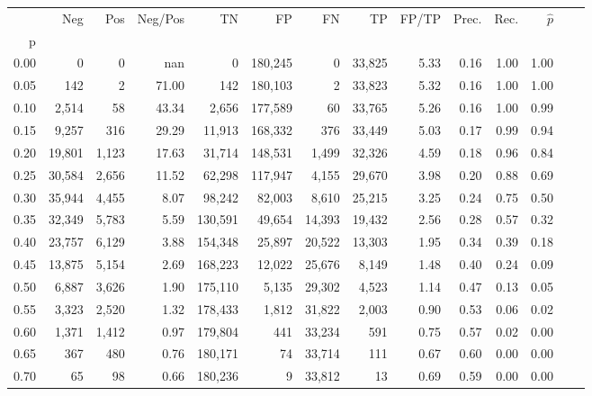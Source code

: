\begin{tabular}{rrrrrrrrrrrrrr}
\toprule
{} &     Neg &    Pos & Neg/Pos &       TN &       FP &      FN &      TP & FP/TP & Prec. &  Rec. & $\hat{p}$ \\
p    &         &        &         &          &          &         &         &       &       &       &           \\
\midrule
0.00 &       0 &      0 &     nan &        0 &  180,245 &       0 &  33,825 &  5.33 &  0.16 &  1.00 &      1.00 \\
0.05 &     142 &      2 &   71.00 &      142 &  180,103 &       2 &  33,823 &  5.32 &  0.16 &  1.00 &      1.00 \\
0.10 &   2,514 &     58 &   43.34 &    2,656 &  177,589 &      60 &  33,765 &  5.26 &  0.16 &  1.00 &      0.99 \\
0.15 &   9,257 &    316 &   29.29 &   11,913 &  168,332 &     376 &  33,449 &  5.03 &  0.17 &  0.99 &      0.94 \\
0.20 &  19,801 &  1,123 &   17.63 &   31,714 &  148,531 &   1,499 &  32,326 &  4.59 &  0.18 &  0.96 &      0.84 \\
0.25 &  30,584 &  2,656 &   11.52 &   62,298 &  117,947 &   4,155 &  29,670 &  3.98 &  0.20 &  0.88 &      0.69 \\
0.30 &  35,944 &  4,455 &    8.07 &   98,242 &   82,003 &   8,610 &  25,215 &  3.25 &  0.24 &  0.75 &      0.50 \\
0.35 &  32,349 &  5,783 &    5.59 &  130,591 &   49,654 &  14,393 &  19,432 &  2.56 &  0.28 &  0.57 &      0.32 \\
0.40 &  23,757 &  6,129 &    3.88 &  154,348 &   25,897 &  20,522 &  13,303 &  1.95 &  0.34 &  0.39 &      0.18 \\
0.45 &  13,875 &  5,154 &    2.69 &  168,223 &   12,022 &  25,676 &   8,149 &  1.48 &  0.40 &  0.24 &      0.09 \\
0.50 &   6,887 &  3,626 &    1.90 &  175,110 &    5,135 &  29,302 &   4,523 &  1.14 &  0.47 &  0.13 &      0.05 \\
0.55 &   3,323 &  2,520 &    1.32 &  178,433 &    1,812 &  31,822 &   2,003 &  0.90 &  0.53 &  0.06 &      0.02 \\
0.60 &   1,371 &  1,412 &    0.97 &  179,804 &      441 &  33,234 &     591 &  0.75 &  0.57 &  0.02 &      0.00 \\
0.65 &     367 &    480 &    0.76 &  180,171 &       74 &  33,714 &     111 &  0.67 &  0.60 &  0.00 &      0.00 \\
0.70 &      65 &     98 &    0.66 &  180,236 &        9 &  33,812 &      13 &  0.69 &  0.59 &  0.00 &      0.00 \\

\end{tabular}
